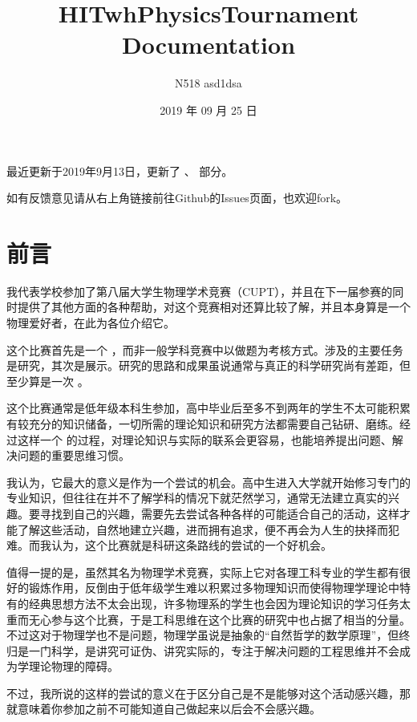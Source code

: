\documentclass[a4paper,10pt,english]{sphinxmanual}
\title{HITwhPhysicsTournament Documentation}
\date{2019 年 09 月 25 日}
\author{N518 asd1dsa}
\begin{document}
\maketitle
\sphinxtableofcontents
{}\label{\detokenize{index::doc}}


最近更新于2019年9月13日，更新了  、  部分。

如有反馈意见请从右上角链接前往Github的Issues页面，也欢迎fork。


\chapter{前言}
\label{\detokenize{1. Preface:id1}}\label{\detokenize{1. Preface::doc}}
我代表学校参加了第八届大学生物理学术竞赛（CUPT），并且在下一届参赛的同时提供了其他方面的各种帮助，对这个竞赛相对还算比较了解，并且本身算是一个物理爱好者，在此为各位介绍它。

这个比赛首先是一个  ，而非一般学科竞赛中以做题为考核方式。涉及的主要任务是研究，其次是展示。研究的思路和成果虽说通常与真正的科学研究尚有差距，但至少算是一次  。

这个比赛通常是低年级本科生参加，高中毕业后至多不到两年的学生不太可能积累有较充分的知识储备，一切所需的理论知识和研究方法都需要自己钻研、磨练。经过这样一个  的过程，对理论知识与实际的联系会更容易，也能培养提出问题、解决问题的重要思维习惯。

我认为，它最大的意义是作为一个尝试的机会。高中生进入大学就开始修习专门的专业知识，但往往在并不了解学科的情况下就茫然学习，通常无法建立真实的兴趣。要寻找到自己的兴趣，需要先去尝试各种各样的可能适合自己的活动，这样才能了解这些活动，自然地建立兴趣，进而拥有追求，便不再会为人生的抉择而犯难。而我认为，这个比赛就是科研这条路线的尝试的一个好机会。

值得一提的是，虽然其名为物理学术竞赛，实际上它对各理工科专业的学生都有很好的锻炼作用，反倒由于低年级学生难以积累过多物理知识而使得物理学理论中特有的经典思想方法不太会出现，许多物理系的学生也会因为理论知识的学习任务太重而无心参与这个比赛，于是工科思维在这个比赛的研究中也占据了相当的分量。不过这对于物理学也不是问题，物理学虽说是抽象的“自然哲学的数学原理”，但终归是一门科学，是讲究可证伪、讲究实际的，专注于解决问题的工程思维并不会成为学理论物理的障碍。

不过，我所说的这样的尝试的意义在于区分自己是不是能够对这个活动感兴趣，那就意味着你参加之前不可能知道自己做起来以后会不会感兴趣。
\end{document}

